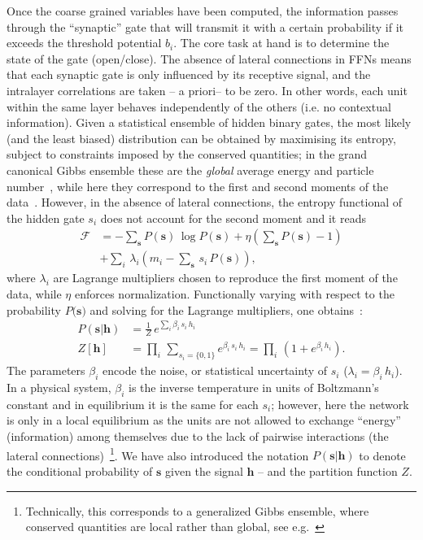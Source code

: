 \documentclass[5p]{elsarticle}
\begin{document}
Once the coarse grained variables have been computed, the information passes through the ``synaptic'' gate that will transmit it with a certain probability if it exceeds the threshold potential $b_i$. The core task at hand is to determine the state of the gate (open/close). The absence of lateral connections in FFNs means that each synaptic gate is only influenced by its receptive signal, and the intralayer correlations are taken -- a priori-- to be zero. In other words, each unit within the same layer behaves independently of the others (i.e. no contextual information). Given a statistical ensemble of hidden binary gates, the most likely (and the least biased) distribution  can be obtained by maximising its entropy, subject to constraints imposed by the conserved quantities; in the grand canonical Gibbs ensemble these are the {\it global} average energy and particle number~\cite{roberto}, while here they correspond to the first and second moments of the data~\cite{zecchina, mckay}. However, in the absence of lateral connections, the entropy functional of the hidden gate $s_i$ does not account for the second moment and it reads
%
\begin{align} \label{eq:entropy2}
\mathscr{F} &= - \sum_{\mathbf{s}} P(\mathbf{s}) \, \log P(\mathbf{s}) + \eta \left( \sum_{\mathbf{s}} P(\mathbf{s}) -1\right) \\ \nonumber
&+ \sum_i \, \lambda_i \left( m_i -  \sum_{\mathbf{s}} \, s_i \, P(\mathbf{s}) \right),
 \end{align}
where $\lambda_i$ are Lagrange multipliers chosen to reproduce the first moment of the data,  while $\eta$ enforces normalization. Functionally varying with respect to the probability $P(\mathbf{s)}$ and solving for the Lagrange multipliers, one  obtains~\cite{roberto}:
%
\begin{align} \label{eq:entropy4}
P(\mathbf{s} | \mathbf{h}) &= \frac{1}{Z} \, e^{ \sum_i \beta_i  \, s_i \, h_i } \\ \nonumber
Z[\mathbf{h}] &= \prod_i \, \sum_{s_i = \{ 0,1\} } e^{\beta_i \, s_i \, h_i}  =\prod_i \, \left( 1+ e^{\beta_i \, h_i} \right).
\end{align}
%
The parameters $\beta_i$ encode the noise, or statistical uncertainty of $s_i$ ($\lambda_i = \beta_i \, h_i$).  In a physical system, $\beta_i$ is the inverse temperature in units of Boltzmann's constant and in equilibrium it is the same for each $s_i$; however, here the network is only in a local equilibrium as the units are not allowed to exchange ``energy'' (information) among themselves due to the lack of pairwise interactions (the lateral connections)~\footnote{Technically, this corresponds to a generalized Gibbs ensemble, where conserved quantities are local rather than global, see e.g.~\cite{calabrese} }. We have also introduced the notation $P(\mathbf{s} | \mathbf{h})$ to denote the conditional probability of $\mathbf{s}$ given the signal $\mathbf{h}$ --  and the partition function $Z$.
\end{document}
